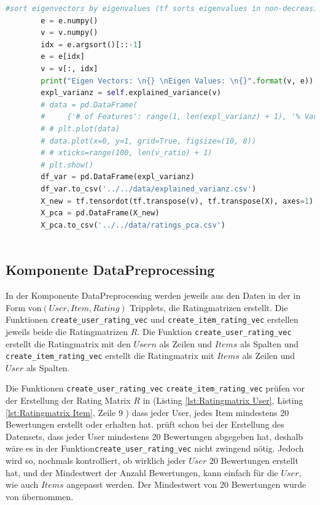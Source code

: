 \begin{lstlisting}[language=Python, caption= Komponente PCA, label=lst:PCA Komponente]
        #sort eigenvectors by eigenvalues (tf sorts eigenvalues in non-decreasing order)
        e = e.numpy()
        v = v.numpy()
        idx = e.argsort()[::-1]
        e = e[idx]
        v = v[:, idx]
        print("Eigen Vectors: \n{} \nEigen Values: \n{}".format(v, e))
        expl_varianz = self.explained_variance(v)
        # data = pd.DataFrame(
        #     {'# of Features': range(1, len(expl_varianz) + 1), '% Variance explained': np.cumsum(expl_varianz * 100)})
        # # plt.plot(data)
        # data.plot(x=0, y=1, grid=True, figsize=(10, 8))
        # # xticks=range(100, len(v_ratio) + 1)
        # plt.show()
        df_var = pd.DataFrame(expl_varianz)
        df_var.to_csv('../../data/explained_varianz.csv')
        X_new = tf.tensordot(tf.transpose(v), tf.transpose(X), axes=1).numpy()
        X_pca = pd.DataFrame(X_new)
        X_pca.to_csv('../../data/ratings_pca.csv')



\end{lstlisting}




\subsection{Komponente DataPreprocessing}
In der Komponente DataPreprocessing werden jeweils aus den Daten in der in Form von\break $(User, Item, Rating)$ Tripplets, die Ratingmatrizen erstellt. Die Funktionen \lstinline{create_user_rating_vec} und \lstinline{create_item_rating_vec} erstellen jeweils beide die Ratingmatrizen $R$. \break Die Funktion \lstinline{create_user_rating_vec} erstellt die Ratingmatrix mit den $Usern$ als Zeilen und $Items$ als Spalten und \lstinline{create_item_rating_vec} erstellt die Ratingmatrix mit $Items$ als Zeilen und $User$ als Spalten.

Die Funktionen \lstinline{create_user_rating_vec} \lstinline{create_item_rating_vec} prüfen vor der Erstellung der Rating Matrix $R$ in (Listing \ref{lst:Ratingmatrix User}, Listing \ref{lst:Ratingmatrix Item}, Zeile 9 ) dass jeder User, jedes Item mindestens 20 Bewertungen erstellt oder erhalten hat. \cite{DatasetReadme} prüft schon bei der Erstellung des Datensets, dass jeder User mindestens 20 Bewertungen abgegeben hat, deshalb wäre es in der Funktion\lstinline{create_user_rating_vec} nicht zwingend nötig. Jedoch wird so, nochmals kontrolliert, ob wirklich jeder $User$ 20 Bewertungen erstellt hat, und der Mindestwert der Anzahl Bewertungen, kann einfach für die $User$, wie auch $Items$ angepasst werden. Der Mindestwert von 20 Bewertungen wurde von \cite{DatasetReadme} übernommen.


